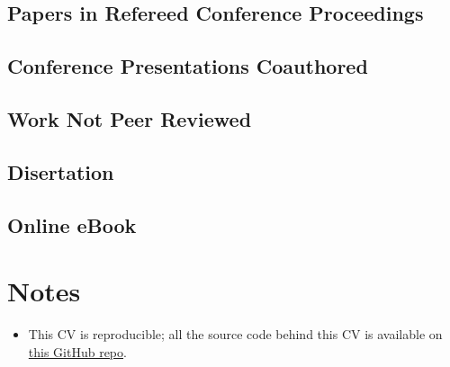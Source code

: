 \documentclass[11pt,a4paper,]{moderncv}
\providecommand{\tightlist}{%
	\setlength{\itemsep}{0pt}\setlength{\parskip}{0pt}}
\begin{document}
\hypertarget{refs_journals2017}{}

\clearpage

\hypertarget{papers-in-refereed-conference-proceedings}{%
\subsection{\texorpdfstring{\textbf{Papers in Refereed Conference
Proceedings}}{Papers in Refereed Conference Proceedings}}\label{papers-in-refereed-conference-proceedings}}

\hypertarget{refs_proceedings}{}

\vspace{7mm}

\hypertarget{conference-presentations-coauthored}{%
\subsection{\texorpdfstring{\textbf{Conference Presentations
Coauthored}}{Conference Presentations Coauthored}}\label{conference-presentations-coauthored}}

\hypertarget{refs_confco}{}

\vspace{7mm}

\hypertarget{work-not-peer-reviewed}{%
\subsection{\texorpdfstring{\textbf{Work Not Peer
Reviewed}}{Work Not Peer Reviewed}}\label{work-not-peer-reviewed}}

\hypertarget{refs_notpeer}{}

\vspace{7mm}

\hypertarget{disertation}{%
\subsection{\texorpdfstring{\textbf{Disertation}}{Disertation}}\label{disertation}}

\hypertarget{refs_student}{}

\vspace{7mm}

\hypertarget{online-ebook}{%
\subsection{\texorpdfstring{\textbf{Online
eBook}}{Online eBook}}\label{online-ebook}}

\hypertarget{refs_ebook}{}

\hypertarget{notes}{%
\section{Notes}\label{notes}}

\begin{itemize}
\tightlist
\item
  This CV is reproducible; all the source code behind this CV is
  available on \href{https://github.com/sarbearschwartz/jy_CV}{this
  GitHub repo}.
\end{itemize}
\end{document}
